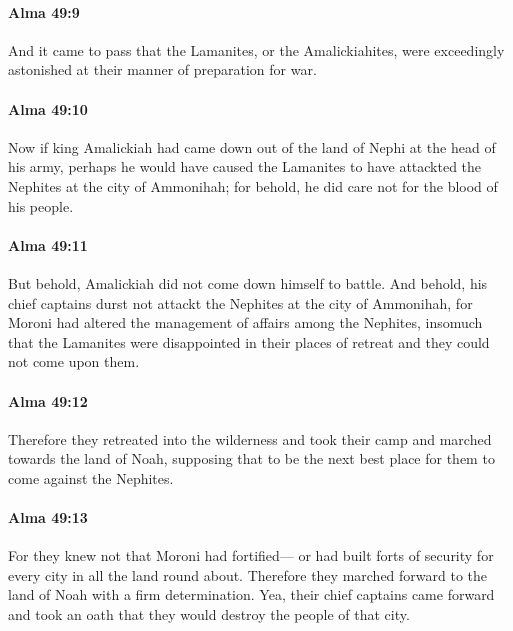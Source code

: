 		\paragraph{Alma 49:9} %
			\label{ALMA-49-9}

			And it came to pass that the Lamanites, or the Amalickiahites,
			were exceedingly astonished at their manner of preparation for war.

		\paragraph{Alma 49:10} %
			\label{ALMA-49-10}

			Now if king Amalickiah had came down out of the land of Nephi
			at the head of his army,
			perhaps he would have caused
			the Lamanites to have attackted the Nephites at the city of Ammonihah;
			for behold, he did care not for the blood of his people.

		\paragraph{Alma 49:11} %
			\label{ALMA-49-11}

			But behold, Amalickiah did not come down himself to battle.
			And behold, his chief captains durst not attackt
			the Nephites at the city of Ammonihah,
			for Moroni had altered the management of affairs among the Nephites,
			insomuch that the Lamanites were disappointed in their places of retreat
			and they could not come upon them.

		\paragraph{Alma 49:12} %
			\label{ALMA-49-12}

			Therefore they retreated into the wilderness
			and took their camp and marched towards the land of Noah,
			supposing that to be the next best place for them to come against the Nephites.

		\paragraph{Alma 49:13} %
			\label{ALMA-49-13}

			For they knew not that Moroni had fortified---
			or had built forts of security for every city in all the land round about.
			Therefore they marched forward to the land of Noah with a firm determination.
			Yea, their chief captains came forward and took an oath
			that they would destroy the people of that city.

